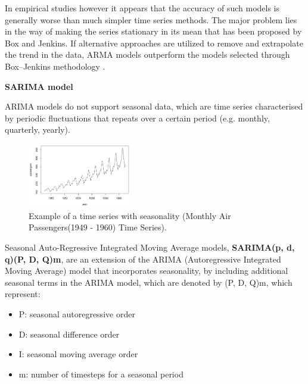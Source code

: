 In empirical studies however it appears that the accuracy of such models is generally worse than much simpler time series methods. The major problem lies in the way of making the series stationary in its mean that has been proposed by Box and Jenkins. If alternative approaches are utilized to remove and extrapolate the trend in the data, ARMA models outperform the models selected through Box–Jenkins methodology \cite{Smith1997}. 

\textbf{SARIMA model}

ARIMA models do not support seasonal data, which are time series characterised by periodic fluctuations that repeats over a certain period (e.g. monthly, quarterly, yearly).
\begin{figure}[H] 
    \centering
    \includegraphics[width=0.4\textwidth]{Machine_learning_thesis/Images/Monthly Air Passengers(1949 - 1960).png}
    \caption{Example of a time series with seasonality (Monthly Air Passengers(1949 - 1960) Time Series).} 
    \label{fig:time_series_seasonality} 
\end{figure}
Seasonal Auto-Regressive Integrated Moving Average models, \textbf{SARIMA(p, d, q)(P, D, Q)m}, are an extension of the ARIMA (Autoregressive Integrated Moving Average) model that incorporates seasonality, by including additional seasonal terms in the ARIMA model, which are denoted by (P, D, Q)m, which represent:
\begin{itemize}
    \item P: seasonal autoregressive order
    \item D: seasonal difference order
    \item I: seasonal moving average order
    \item m: number of timesteps for a seasonal period
\end{itemize}

